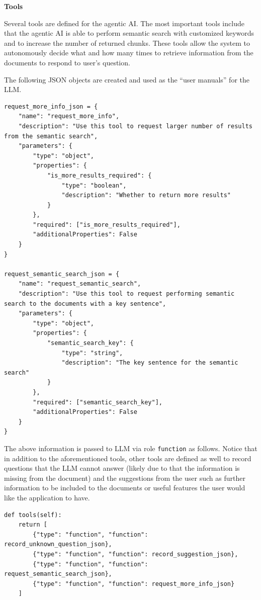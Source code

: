 \vspace{0.1in}
\noindent \textbf{Tools}
\vspace{0.1in}

Several tools are defined for the agentic AI. The most important tools include that the agentic AI is able to perform semantic search with customized keywords and to increase the number of returned chunks. These tools allow the system to autonomously decide what and how many times to retrieve information from the documents to respond to user's question.

The following JSON objects are created and used as the ``user manuals'' for the LLM.

\begin{lstlisting}
request_more_info_json = {
    "name": "request_more_info",
    "description": "Use this tool to request larger number of results from the semantic search",
    "parameters": {
        "type": "object",
        "properties": {
            "is_more_results_required": {
                "type": "boolean",
                "description": "Whether to return more results"
            }
        },
        "required": ["is_more_results_required"],
        "additionalProperties": False
    }
}

request_semantic_search_json = {
    "name": "request_semantic_search",
    "description": "Use this tool to request performing semantic search to the documents with a key sentence",
    "parameters": {
        "type": "object",
        "properties": {
            "semantic_search_key": {
                "type": "string",
                "description": "The key sentence for the semantic search"
            }
        },
        "required": ["semantic_search_key"],
        "additionalProperties": False
    }
}
\end{lstlisting}

The above information is passed to LLM via role \verb|function| as follows. Notice that in addition to the aforementioned tools, other tools are defined as well to record questions that the LLM cannot answer (likely due to that the information is missing from the document) and the suggestions from the user such as further information to be included to the documents or useful features the user would like the application to have.

\begin{lstlisting}
def tools(self):
    return [
        {"type": "function", "function": record_unknown_question_json},
        {"type": "function", "function": record_suggestion_json},
        {"type": "function", "function": request_semantic_search_json},
        {"type": "function", "function": request_more_info_json}
    ]
\end{lstlisting}

